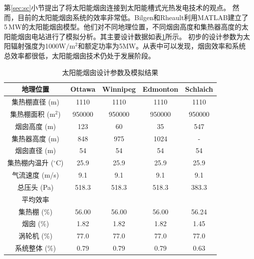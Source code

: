第\ref{sec:sc}小节提出了将太阳能烟囱连接到太阳能槽式光热发电技术的观点。
然而，目前的太阳能烟囱系统的效率非常低。Bilgen和Rheault利用MATLAB建立了5$\,\mathrm{MW}$的太阳能烟囱模型\cite{Bilgen2005}。他们对不同地理位置，不同烟囱高度和集热器高度的太阳能烟囱电站进行了模拟分析。其主要设计数据如表\ref{tab:sc}所示。 初步的设计参数为太阳辐射强度为1000$\mathrm{W/m^2}$和额定功率为5$\mathrm{MW}$。从表中可以发现，烟囱效率和系统总效率都很低，太阳能烟囱技术仍处于发展阶段。
\begin{table}[htbp]
\setlength{\abovecaptionskip}{-10pt}
	\caption{太阳能烟囱设计参数及模拟结果}
	\begin{center}
	\begin{tabular}{ccccc}
		\toprule
		地理位置	&Ottawa    &Winnipeg    &Edmonton    &Schlaich\\
		\midrule
		集热棚直径 (m)    &	1110	&	1110	&	1110	&	1110 \\
  集热棚面积 ($\mathrm{m^2}$)    & 950000    & 950000	&	950000	&	950000\\
  烟囱高度 (m)    &123    &60    &    35&    547\\
  集热器高度 (m)    &848    &975    &1024    &    -\\
  烟囱直径 (m)    &54    &54    &54    &54\\
  集热棚内温升 ($\mathrm{^\circ C}$)    &25.9    &25.9    &25.9    &25.9\\
  气流速度 (m/s)&9.1    &9.1    &9.1    &9.1\\
  总压头 (Pa)&518.3    &518.3    &518.3    &383.3\\
  平均效率\\
  集热棚 (\%)    &56.00    &56.00    &56.00    &56.24\\
  烟囱 (\%)    &1.82    &1.82    &1.82    &1.45\\
  涡轮机 (\%)    &77.0    &77.0    &77.0    &77.0\\
  系统整体 (\%)    &0.79    &0.79    &0.79    &0.63\\
		\bottomrule
	\end{tabular}
	\end{center}
	\label{tab:sc}
\end{table}

